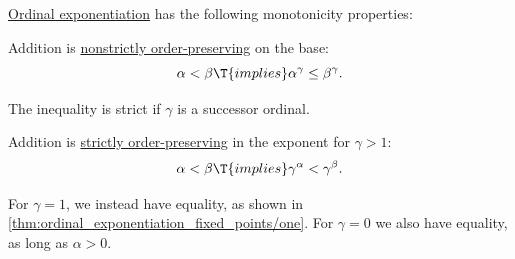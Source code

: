 \begin{proposition}\label{thm:ordinal_exponentiation_is_monotone}
  \hyperref[def:ordinal_exponentiation]{Ordinal exponentiation} has the following monotonicity properties:
  \begin{thmenum}
     Addition is \hyperref[def:order_function/preserving]{nonstrictly order-preserving} on the base:
    \begin{equation*}
      \alpha < \beta \T{implies} \alpha^\gamma \leq \beta^\gamma.
    \end{equation*}

    The inequality is strict if \( \gamma \) is a successor ordinal.

     Addition is \hyperref[eq:def:order_function/preserving/strict]{strictly order-preserving} in the exponent for \( \gamma > 1 \):
    \begin{equation*}
      \alpha < \beta \T{implies} \gamma^\alpha < \gamma^\beta.
    \end{equation*}

    For \( \gamma = 1 \), we instead have equality, as shown in \cref{thm:ordinal_exponentiation_fixed_points/one}. For \( \gamma = 0 \) we also have equality, as long as \( \alpha > 0 \).
  \end{thmenum}
\end{proposition}

